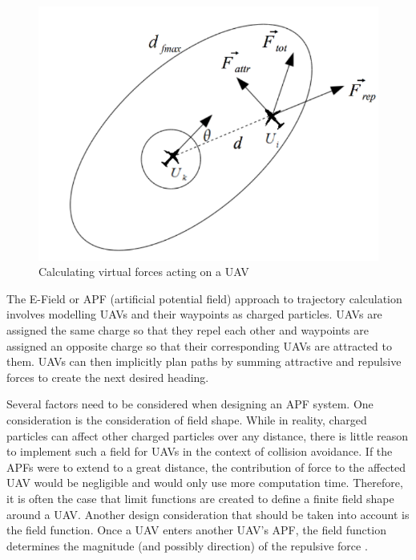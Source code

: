 \documentclass[conference]{IEEEtran}
\begin{document}
\begin{figure}
	\includegraphics [width=1\columnwidth] {2011Ruchti}
	\caption{Calculating virtual forces acting on a UAV \cite{ruchti2011uav}}
	\label{fig:forceCalculation}
\end{figure}


The E-Field or APF (artificial potential field) approach to trajectory calculation involves modelling UAVs and their waypoints as charged particles.  UAVs are assigned the same charge so that they repel each other and waypoints are assigned an opposite charge so that their corresponding UAVs are attracted to them.  UAVs can then implicitly plan paths by summing attractive and repulsive forces to create the next desired heading.

Several factors need to be considered when designing an APF system.  One consideration is the consideration of field shape.  While in reality, charged particles can affect other charged particles over any distance, there is little reason to implement such a field for UAVs in the context of collision avoidance.  If the APFs were to extend to a great distance, the contribution of force to the affected UAV would be negligible and would only use more computation time.  Therefore, it is often the case that limit functions are created to define a finite field shape around a UAV.  Another design consideration that should be taken into account is the field function.  Once a UAV enters another UAV’s APF, the field function determines the magnitude (and possibly direction) of the repulsive force \cite{khatib1985real}.
\end{document}

